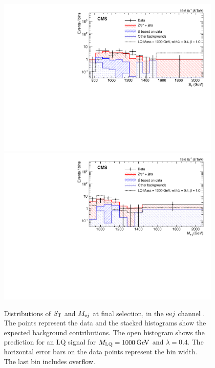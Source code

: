 \begin{figure}[!htb]
       \centering
       {\includegraphics[width=.75\textwidth]{Figures/Figures_ee_ST_pf_ee_single_Fullselection.pdf}}
       {\includegraphics[width=.75\textwidth]{Figures/Figures_ee_M_singleLQ_epfjet_Masshigh_Fullselection.pdf}}
       \caption{Distributions of $S_{\mathrm{T}}$ and $M_{\mathrm{e} j}$ at final selection, in the $\mathrm{e} \mathrm{e} j$ channel .  The points represent the data and the stacked histograms show the expected background contributions.  The open histogram shows the prediction for an LQ signal for $M_{\text{\text{LQ}}}=1000\,\text{Ge\hspace{-.08em}V}$ and $\lambda=0.4$.  The horizontal error bars on the data points represent the bin width.  The last bin includes overflow. \label{figapp:elefinalsel}}
\end{figure}

